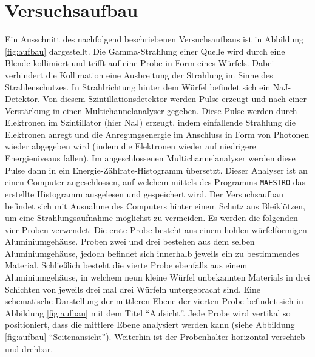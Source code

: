 \newpage
\section{Versuchsaufbau}
\label{sec:Aufbau}

Ein Ausschnitt des nachfolgend beschriebenen Versuchsaufbaus
ist in Abbildung \ref{fig:aufbau} dargestellt.
Die Gamma-Strahlung einer 
Quelle wird durch eine Blende kollimiert und trifft auf eine Probe in Form
eines Würfels.
Dabei verhindert die Kollimation eine Ausbreitung der Strahlung im Sinne
des Strahlenschutzes.
In Strahlrichtung hinter dem Würfel befindet sich ein NaJ-Detektor.
Von diesem Szintillationsdetektor werden Pulse erzeugt
und nach einer Verstärkung in einen Multichannelanalyser gegeben.
Diese Pulse werden durch Elektronen im Szintillator (hier NaJ) erzeugt,
indem einfallende Strahlung die Elektronen anregt und die Anregungsenergie
im Anschluss in Form von Photonen wieder abgegeben wird (indem die Elektronen
wieder auf niedrigere Energieniveaus fallen).
Im angeschlossenen Multichannelanalyser werden diese Pulse dann in ein
Energie-Zählrate-Histogramm übersetzt.
Dieser Analyser ist an einen Computer angeschlossen,
auf welchem mittels des Programms \texttt{MAESTRO}
das erstellte Histogramm ausgelesen und gespeichert wird.
Der Versuchsaufbau befindet sich mit Ausnahme des Computers hinter einem
Schutz aus Bleiklötzen, um eine Strahlungsaufnahme möglichst zu vermeiden.
Es werden die folgenden vier Proben verwendet:
Die erste Probe besteht aus einem hohlen würfelförmigen Aluminiumgehäuse.
Proben zwei und drei bestehen aus dem selben Aluminiumgehäuse, jedoch befindet
sich innerhalb jeweils ein zu bestimmendes Material.
Schließlich besteht die vierte Probe ebenfalls aus einem Aluminiumgehäuse,
in welchem neun kleine Würfel unbekannten Materials in drei Schichten
von jeweils drei mal drei Würfeln untergebracht sind.
Eine schematische Darstellung der mittleren Ebene der vierten Probe befindet sich
in Abbildung \ref{fig:aufbau} mit dem Titel \enquote{Aufsicht}.
Jede Probe wird vertikal so positioniert, dass die mittlere Ebene analysiert
werden kann (siehe Abbildung \ref{fig:aufbau} \enquote{Seitenansicht}).
Weiterhin ist der Probenhalter horizontal verschieb- und drehbar.

